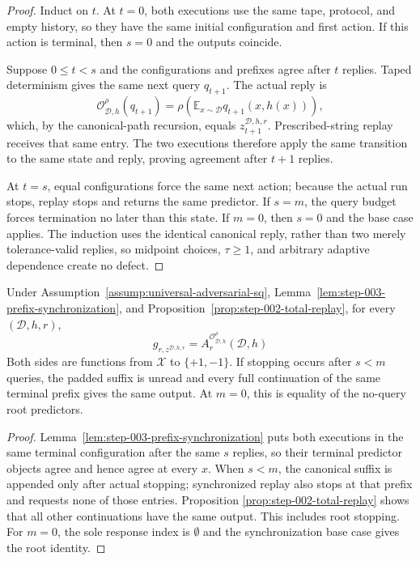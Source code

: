 \begin{proof}
Induct on \(t\).  At \(t=0\), both executions use the same tape, protocol,
and empty history, so they have the same initial configuration and first
action.  If this action is terminal, then \(s=0\) and the outputs coincide.

Suppose \(0\le t<s\) and the configurations and prefixes agree after
\(t\) replies.  Taped determinism gives the same next query
\(q_{t+1}\).  The actual reply is
\[
\mathcal O^\rho_{\mathcal D,h}(q_{t+1})
=\rho\!\left(
\mathbb E_{x\sim\mathcal D}q_{t+1}(x,h(x))
\right),
\tag{A.25}\label{eq:synchronized-reply}
\]
which, by the canonical-path recursion, equals
\(z^{\mathcal D,h,r}_{t+1}\).  Prescribed-string replay receives that same
entry.  The two executions therefore apply the same transition to the same
state and reply, proving agreement after \(t+1\) replies.

At \(t=s\), equal configurations force the same next action; because the
actual run stops, replay stops and returns the same predictor.  If \(s=m\),
the query budget forces termination no later than this state.  If \(m=0\),
then \(s=0\) and the base case applies.  The induction uses the identical
canonical reply, rather than two merely tolerance-valid replies, so midpoint
choices, \(\tau\ge1\), and arbitrary adaptive dependence create no defect.
\end{proof}

\begin{proposition}
\label{prop:step-003-terminal-replay}
Under Assumption~\ref{assump:universal-adversarial-sq},
Lemma~\ref{lem:step-003-prefix-synchronization}, and
Proposition~\ref{prop:step-002-total-replay}, for every
\((\mathcal D,h,r)\),
\[
g_{r,z^{\mathcal D,h,r}}
=A_r^{\mathcal O^\rho_{\mathcal D,h}}(\mathcal D,h)
\tag{A.26}\label{eq:terminal-replay-identity}
\]
Both sides are functions from \(\mathcal X\) to \(\{+1,-1\}\).
If stopping occurs after \(s<m\) queries, the padded suffix is unread and
every full continuation of the same terminal prefix gives the same output.
At \(m=0\), this is equality of the no-query root predictors.
\end{proposition}

\begin{proof}
Lemma~\ref{lem:step-003-prefix-synchronization} puts both executions in the
same terminal configuration after the same \(s\) replies, so their terminal
predictor objects agree and hence agree at every \(x\).  When \(s<m\), the
canonical suffix is appended only after actual stopping; synchronized replay
also stops at that prefix and requests none of those entries.  Proposition
\ref{prop:step-002-total-replay} shows that all other continuations have the
same output.  This includes root stopping.  For \(m=0\), the sole response
index is \(\emptyset\) and the synchronization base case gives the root
identity.
\end{proof}

